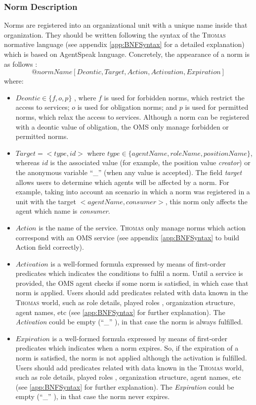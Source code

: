 \subsubsection{Norm Description}
Norms are registered into an organizational unit with a unique name inside that organization. They should be written following the syntax of the \textsc{Thomas} normative language (see appendix \ref{app:BNFSyntax} for a detailed explanation) which is based on AgentSpeak language. Concretely, the appearance of a norm is as follows : \\
$$@normName[Deontic, Target, Action, Activation, Expiration]$$
where:

\begin{itemize}
 \item $Deontic \in \lbrace f,o,p \rbrace$ , where $f$ is used for forbidden norms, which restrict the access to services; $o$ is used for obligation norms; and $p$ is used for permitted norms, which relax the access to services. Although a norm can be registered with a deontic value  of obligation, the OMS only manage forbidden or permitted norms. 	
 \item $Target=<type,id>$ where $type \in   \lbrace agentName, roleName, positionName \rbrace $, whereas $id$ is the associated value (for example, the position value \textit{creator}) or the anonymous variable ``\_'' (when any value is accepted).  The field \textit{target} allows users to determine which agents will be affected by a norm. For example, taking into account an scenario in which a norm was registered in a unit with the target $<agentName, consumer>$, this norm only affects the agent which name is \textit{consumer}. 
 
 \item $Action$ is the name of the service. \textsc{Thomas} only manage norms which action correspond with an OMS service (see appendix \ref{app:BNFSyntax} to build Action field correctly).
 
 \item $Activation$ is a well-formed formula expressed by means of first-order predicates which indicates the conditions to fulfil a norm. Until a service is provided, the OMS agent checks if some norm is satisfied, in which case that norm is applied. Users should add predicates related with data known in the \textsc{Thomas} world, such as role details, played roles , organization structure, agent names, etc (see \ref{app:BNFSyntax} for further explanation). The \textit{Activation}  could be empty (``\_'' ), in that case the norm is always fulfilled.
 
 \item  $Expiration$ is a well-formed formula expressed by means of first-order predicates which indicates when a norm expires. So, if the expiration of a norm is satisfied, the norm is not applied although the activation is fulfilled. Users should add predicates related with data known in the \textsc{Thomas} world, such as role details, played roles , organization structure, agent names, etc (see \ref{app:BNFSyntax} for further explanation). The  \textit{Expiration} could be empty (``\_'' ), in that case the norm never expires.
 
\end{itemize}

